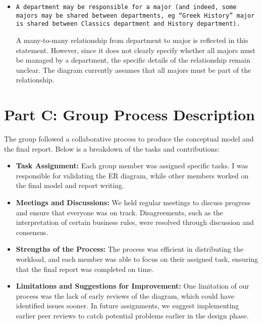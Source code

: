 \documentclass[a4paper,12pt]{article}
\begin{document}
\begin{itemize}
  \item \texttt{A department may be responsible for a major (and indeed, some majors may be shared between departments, eg “Greek History” major is shared between Classics department and History department).}

  A many-to-many relationship from department to major is reflected in this statement. However, since it does not clearly specify whether all majors must be managed by a department, the specific details of the relationship remain unclear. The diagram currently assumes that all majors must be part of the relationship.




\end{itemize}

\newpage

\section*{Part C: Group Process Description}
\hypertarget{PartC}{}
\noindent
The group followed a collaborative process to produce the conceptual model and the final report. Below is a breakdown of the tasks and contributions:

\begin{itemize}
    \item \textbf{Task Assignment:} Each group member was assigned specific tasks. I was responsible for validating the ER diagram, while other members worked on the final model and report writing.
    
    \item \textbf{Meetings and Discussions:} We held regular meetings to discuss progress and ensure that everyone was on track. Disagreements, such as the interpretation of certain business rules, were resolved through discussion and consensus.

    \item \textbf{Strengths of the Process:} The process was efficient in distributing the workload, and each member was able to focus on their assigned task, ensuring that the final report was completed on time.

    \item \textbf{Limitations and Suggestions for Improvement:} One limitation of our process was the lack of early reviews of the diagram, which could have identified issues sooner. In future assignments, we suggest implementing earlier peer reviews to catch potential problems earlier in the design phase.
\end{itemize}
\end{document}
